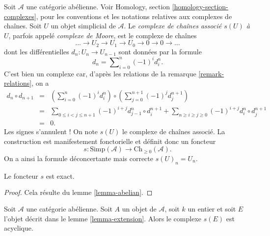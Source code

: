 \noindent
Soit $\mathcal{A}$ une catégorie abélienne. Voir Homology, section
\ref{homology-section-complexes}, pour les conventions et les notations
relatives aux complexes de chaînes. Soit $U$ un objet simplicial de
$\mathcal{A}$. Le {\it complexe de chaînes associé $s(U)$ à $U$},
parfois appelé {\it complexe de Moore}, est le complexe de chaînes
$$
\ldots \to U_2 \to U_1 \to U_0 \to 0 \to 0 \to \ldots
$$
dont les différentielles $d_n : U_n \to U_{n - 1}$ sont données par la formule
$$
d_n = \sum\nolimits_{i = 0}^n (-1)^i d^n_i.
$$
C'est bien un complexe car, d'après les relations de la remarque
\ref{remark-relations}, on a
\begin{eqnarray*}
d_n \circ d_{n + 1}
& = &
(\sum\nolimits_{i = 0}^n (-1)^i d^n_i) \circ
(\sum\nolimits_{j = 0}^{n + 1} (-1)^j d^{n + 1}_j) \\
& = &
\sum\nolimits_{0 \leq i < j \leq n + 1}
(-1)^{i + j} d^n_{j - 1} \circ d^{n + 1}_i
+
\sum\nolimits_{n \geq i \geq j \geq 0}
(-1)^{i + j} d^n_i \circ d^{n + 1}_j \\
& = & 0.
\end{eqnarray*}
Les signes s'annulent ! On note $s(U)$ le complexe de chaînes associé.
La construction est manifestement fonctorielle et définit donc un foncteur
$$
s : \text{Simp}(\mathcal{A}) \longrightarrow \text{Ch}_{\geq 0}(\mathcal{A}).
$$
On a ainsi la formule déconcertante mais correcte $s(U)_n = U_n$.

\begin{lemma}
\label{lemma-s-exact}
Le foncteur $s$ est exact.
\end{lemma}

\begin{proof}
Cela résulte du lemme \ref{lemma-abelian}.
\end{proof}

\begin{lemma}
\label{lemma-homology-extension}
Soit $\mathcal{A}$ une catégorie abélienne. Soit $A$ un objet de
$\mathcal{A}$, soit $k$ un entier et soit $E$ l'objet décrit dans le
lemme \ref{lemma-extension}. Alors le complexe $s(E)$ est acyclique.
\end{lemma}

